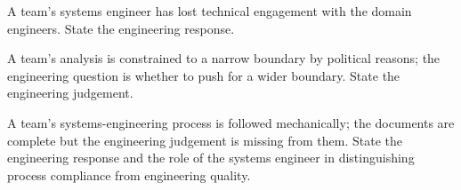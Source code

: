 \begin{exercise}
A team's systems engineer has lost technical engagement with the domain engineers. State the engineering response.
\end{exercise}

\begin{exercise}
A team's analysis is constrained to a narrow boundary by political reasons; the engineering question is whether to push for a wider boundary. State the engineering judgement.
\end{exercise}

\begin{exercise}
A team's systems-engineering process is followed mechanically; the documents are complete but the engineering judgement is missing from them. State the engineering response and the role of the systems engineer in distinguishing process compliance from engineering quality.
\end{exercise}

